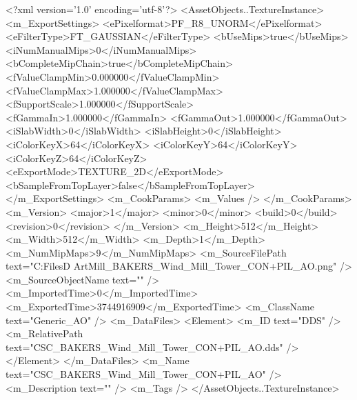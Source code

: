 <?xml version='1.0' encoding='utf-8'?>
<AssetObjects..TextureInstance>
  <m_ExportSettings>
    <ePixelformat>PF_R8_UNORM</ePixelformat>
    <eFilterType>FT_GAUSSIAN</eFilterType>
    <bUseMips>true</bUseMips>
    <iNumManualMips>0</iNumManualMips>
    <bCompleteMipChain>true</bCompleteMipChain>
    <fValueClampMin>0.000000</fValueClampMin>
    <fValueClampMax>1.000000</fValueClampMax>
    <fSupportScale>1.000000</fSupportScale>
    <fGammaIn>1.000000</fGammaIn>
    <fGammaOut>1.000000</fGammaOut>
    <iSlabWidth>0</iSlabWidth>
    <iSlabHeight>0</iSlabHeight>
    <iColorKeyX>64</iColorKeyX>
    <iColorKeyY>64</iColorKeyY>
    <iColorKeyZ>64</iColorKeyZ>
    <eExportMode>TEXTURE_2D</eExportMode>
    <bSampleFromTopLayer>false</bSampleFromTopLayer>
  </m_ExportSettings>
  <m_CookParams>
    <m_Values />
  </m_CookParams>
  <m_Version>
    <major>1</major>
    <minor>0</minor>
    <build>0</build>
    <revision>0</revision>
  </m_Version>
  <m_Height>512</m_Height>
  <m_Width>512</m_Width>
  <m_Depth>1</m_Depth>
  <m_NumMipMaps>9</m_NumMipMaps>
  <m_SourceFilePath text="C:\Users\Shadow\Desktop\Working Files\3D Art\BAKERS\Wind Mill\tower\CSC_BAKERS_Wind_Mill_Tower_CON+PIL_AO.png" />
  <m_SourceObjectName text="" />
  <m_ImportedTime>0</m_ImportedTime>
  <m_ExportedTime>3744916909</m_ExportedTime>
  <m_ClassName text="Generic_AO" />
  <m_DataFiles>
    <Element>
      <m_ID text="DDS" />
      <m_RelativePath text="CSC_BAKERS_Wind_Mill_Tower_CON+PIL_AO.dds" />
    </Element>
  </m_DataFiles>
  <m_Name text="CSC_BAKERS_Wind_Mill_Tower_CON+PIL_AO" />
  <m_Description text="" />
  <m_Tags />
</AssetObjects..TextureInstance>